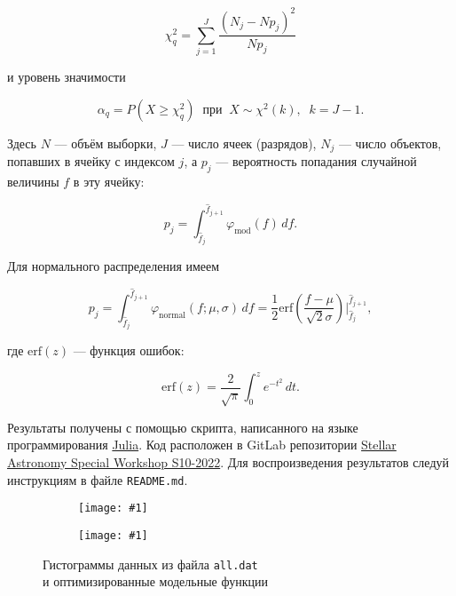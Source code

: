 \documentclass[a4paper, oneside]{article}
\newcommand{\su}{\vspace{-0.5em}}
\newlength{\imagewidth}
\newlength{\imageheight}
\newcommand{\subgraphics}[1]{
\settowidth{\imagewidth}{\texttt{[image: \#1]}}%
\begin{subfigure}{\imagewidth}%
    \texttt{[image: \#1]}%
\end{subfigure}%
}
\begin{document}
\su
\begin{equation}
  \chi_q^2 = \sum_{j=1}^{J} \frac{(N_j - N p_j)^2}{N p_j}
\end{equation}

и уровень значимости

\su
\begin{equation}
  \alpha_q = P(X \geqslant \chi_q^2) \;\; \text{при} \;\; X \sim \chi^2(k), \;\; k = J - 1.
\end{equation}

Здесь $ N $ --- объём выборки, $ J $ --- число ячеек (разрядов), $ N_j $ --- число объектов, попавших в ячейку с индексом $ j $, а $ p_j $ --- вероятность попадания случайной величины $ f $ в эту ячейку:

\su
\begin{equation}
  p_j = \int_{\hat{f}_j}^{\hat{f}_{j+1}} \varphi_\text{mod}(f) \, df.
\end{equation}

Для нормального распределения имеем

\su
\begin{equation}
  p_j = \int_{\hat{f}_j}^{\hat{f}_{j+1}} \varphi_\text{normal}(f; \mu, \sigma) \, df = \frac{1}{2} \mathrm{erf}{\left( \frac{f - \mu}{\sqrt{2} \sigma} \right)} \bigg|_{\hat{f}_j}^{\hat{f}_{j+1}},
\end{equation}

где $ \mathrm{erf}(z) $ --- функция ошибок:

\su
\begin{equation}
  \mathrm{erf}(z) = \frac{2}{\sqrt{\pi}} \int_0^z e^{-t^2} \, dt.
\end{equation}

Результаты получены с помощью скрипта, написанного на языке программирования \href{https://julialang.org}{Julia}. Код расположен в GitLab репозитории \href{https://gitlab.com/paveloom-g/university/s10-2022/stellar-astronomy-special-workshop}{Stellar Astronomy Special Workshop S10-2022}. Для воспроизведения результатов следуй инструкциям в файле {\footnotesize \texttt{README.md}}.

\newpage





\newpage

\captionsetup{justification=centering}

\begin{figure}[H]
  \centering
  \setlength{\imageheight}{6.2cm}
  \subgraphics{all/histogram, 0.1}
  \subgraphics{all/histogram, 0.2}
  \caption{Гистограммы данных из файла \texttt{all.dat} \\ и оптимизированные модельные функции}
\end{figure}
\end{document}
